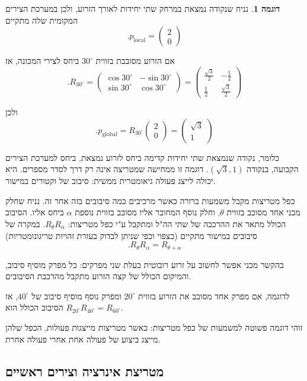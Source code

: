 \documentclass[12pt]{report}
\theoremstyle{plain}
\theoremstyle{definition}
\newtheorem{example}{דוגמה}[chapter]
\newcommand{\0}{\mathbf{0}}
\begin{document}
\begin{example}
נניח שנקודה נמצאת במרחק שתי יחידות לאורך הזרוע, ולכן במערכת הצירים המקומית שלה מתקיים
$$
.p_{\mathrm{local}}
=
\begin{pmatrix}
2 \\
0
\end{pmatrix}
$$

אם הזרוע מסובבת בזווית
$
30^\circ
$
ביחס לצירי המכונה, אז
$$
.R_{30^\circ}
=
\begin{pmatrix}
\cos 30^\circ & -\sin 30^\circ \\
\sin 30^\circ & \cos 30^\circ
\end{pmatrix}
=
\begin{pmatrix}
\frac{\sqrt{3}}{2} & -\frac{1}{2} \\
\frac{1}{2} & \frac{\sqrt{3}}{2}
\end{pmatrix}
$$

ולכן
$$
.p_{\mathrm{global}}
=
R_{30^\circ}
\begin{pmatrix}
2 \\
0
\end{pmatrix}
=
\begin{pmatrix}
\sqrt{3} \\
1
\end{pmatrix}
$$

כלומר, נקודה שנמצאת שתי יחידות קדימה ביחס לזרוע נמצאת, ביחס למערכת הצירים הקבועה, בנקודה
$(\sqrt{3},1)$.
דוגמה זו ממחישה שמטריצה אינה רק דרך לסדר מספרים.
היא יכולה לייצג פעולה גיאומטרית ממשית: סיבוב של וקטורים במישור.
\end{example}

כפל מטריצות מקבל משמעות ברורה כאשר מרכיבים כמה סיבובים בזה אחר זה.
נניח שחלק מכני אחד מסובב בזווית
$\theta$,
וחלק נוסף המחובר אליו מסובב בזווית נוספת
$\alpha$
ביחס אליו.
הסיבוב הכולל מתאר את ההרכבה של שתי הה"ל ומתקבל ע"י כפל מטריצות:
$R_\theta R_\alpha$.
במקרה של סיבובים במישור מתקיים (כצפוי וכפי שניתן לבדוק בעזרת זהויות טריגונומטריות)
$$
.R_\theta R_\alpha = R_{\theta+\alpha}
$$

בהקשר מכני אפשר לחשוב על זרוע רובוטית בעלת שני מפרקים:
כל מפרק מוסיף סיבוב, והמיקום הכולל של קצה הזרוע מתקבל מהרכבת הסיבובים.

לדוגמה, אם מפרק אחד מסובב את הזרוע בזווית
$20^\circ$
ומפרק נוסף מוסיף סיבוב של
$40^\circ$,
אז הסיבוב הכולל הוא
$R_{20^\circ}R_{40^\circ}=R_{60^\circ}$.

זוהי דוגמה פשוטה למשמעות של כפל מטריצות:
כאשר מטריצות מייצגות פעולות, הכפל שלהן מייצג ביצוע של פעולה אחת אחרי פעולה אחרת.

\subsection*{מטריצת אינרציה וצירים ראשיים}
\end{document}
